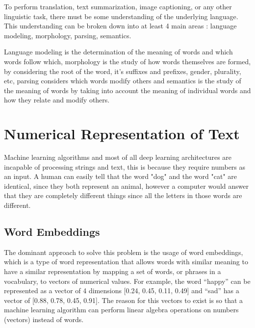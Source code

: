 To perform translation, text summarization, image captioning, or any other linguistic task, there must be some understanding of the underlying language. This understanding can be broken down into at least 4 main areas : language modeling, morphology, parsing, semantics. \par 

Language modeling is the determination of the meaning of words and which words follow which, morphology is the study of how words themselves are formed, by considering the root of the word, it's suffixes and prefixes, gender, plurality, etc, parsing considers which words modify others and semantics is the study of the meaning of words by taking into account the meaning of individual words and how they relate and modify others. \cite{Otter2018} \par 



\section{Numerical Representation of Text}


\par Machine learning algorithms and most of all deep learning architectures are incapable of processing strings and text, this is because they require numbers as an input. \cite{Vidhya2017} A human can easily tell that the word "dog" and the word "cat" are identical, since they both represent an animal, however a computer would answer that they are completely different things since all the letters in those words are different. 

    \subsection{Word Embeddings}

    \par The dominant approach to solve this problem is the usage of word embeddings, which is a type of word representation that allows words with similar meaning to have a similar representation by mapping a set of words, or phrases in a vocabulary, to vectors of numerical values. For example, the word “happy” can be represented as a vector of 4 dimensions [0.24, 0.45, 0.11, 0.49] and “sad” has a vector of [0.88, 0.78, 0.45, 0.91]. The reason for this vectors to exist is so that a machine learning algorithm can perform linear algebra operations on numbers (vectors) instead of words. \cite{MuratMustafa}

